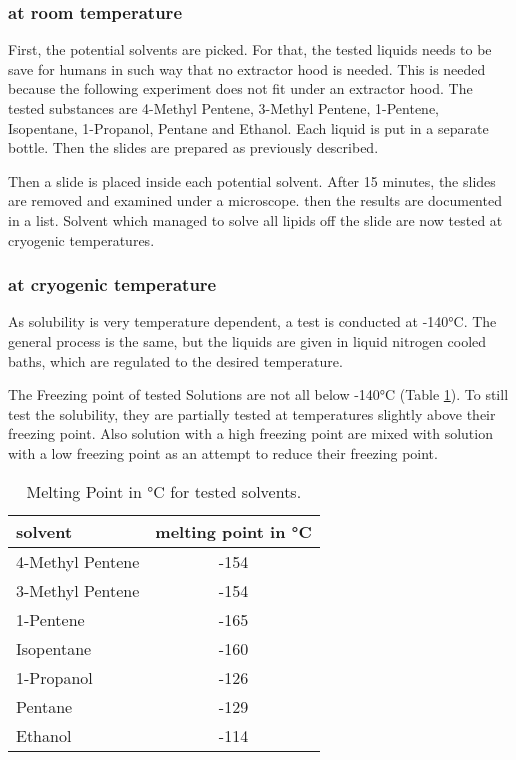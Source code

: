 \subsubsection{at room temperature}

First, the potential solvents are picked. For that, the tested liquids needs to be save for humans in such way that no extractor hood is needed. This is needed because the following experiment does not fit under an extractor hood. The tested substances are 4-Methyl Pentene, 3-Methyl Pentene, 1-Pentene, Isopentane, 1-Propanol, Pentane and Ethanol. Each liquid is put in a separate bottle. Then the slides are prepared  as previously described.

Then a slide is placed inside each potential solvent. After 15 minutes, the slides are removed and examined under a microscope. then the results are documented in a list. Solvent which managed to solve all lipids off the slide are now tested at cryogenic temperatures.

\subsubsection{at cryogenic temperature}
\label{chapter:meltingtemp}

As solubility is very temperature dependent, a test is conducted at -140°C. The general process is the same, but the liquids are given in liquid nitrogen cooled baths, which are regulated to the desired temperature. 

The Freezing point of tested Solutions are not all below -140°C (Table \ref{table:SchmelztemperaturLösungsmittel}).
To still test the solubility, they are partially tested at temperatures slightly above their freezing point. Also solution with a high freezing point are mixed with solution with a low freezing point as an attempt to reduce their freezing point.

\begin{table}[hbt!]
	\centering
	\begin{tabular}{|l|c|}
		\hline
		solvent & melting point in °C \\
		\hline
		\hline
		4-Methyl Pentene & -154 \\ 
		\hline
		3-Methyl Pentene & -154 \\
		\hline
		1-Pentene & -165 \\
		\hline
		Isopentane & -160 \\
		\hline
		1-Propanol & -126 \\
		\hline
		Pentane & -129 \\
		\hline
		Ethanol & -114 \\
		\hline
	\end{tabular}
	\caption{Melting Point in °C for tested solvents.}
	\label{table:SchmelztemperaturLösungsmittel}
\end{table}

